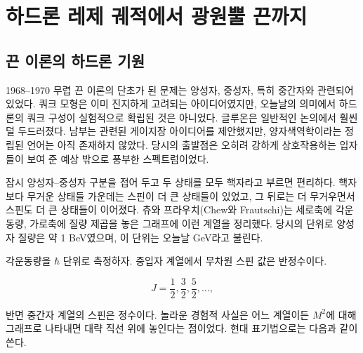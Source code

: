 \chapter{하드론 레제 궤적에서 광원뿔 끈까지}


\section{끈 이론의 하드론 기원}

1968--1970 무렵 끈 이론의 단초가 된 문제는 양성자, 중성자, 특히 중간자와 관련되어 있었다. 쿼크 모형은 이미 진지하게 고려되는 아이디어였지만, 오늘날의 의미에서 하드론의 쿼크 구성이 실험적으로 확립된 것은 아니었다. 글루온은 일반적인 논의에서 훨씬 덜 두드러졌다. 남부는 관련된 게이지장 아이디어를 제안했지만, 양자색역학이라는 정립된 언어는 아직 존재하지 않았다. 당시의 출발점은 오히려 강하게 상호작용하는 입자들이 보여 준 예상 밖으로 풍부한 스펙트럼이었다.

잠시 양성자--중성자 구분을 접어 두고 두 상태를 모두 핵자라고 부르면 편리하다. 핵자보다 무거운 상태들 가운데는 스핀이 더 큰 상태들이 있었고, 그 뒤로는 더 무거우면서 스핀도 더 큰 상태들이 이어졌다. 츄와 프라우치(Chew와 Frautschi)는 세로축에 각운동량, 가로축에 질량 제곱을 놓은 그래프에 이런 계열을 정리했다. 당시의 단위로 양성자 질량은 약 1 BeV였으며, 이 단위는 오늘날 GeV라고 불린다.

각운동량을 \(\hbar\) 단위로 측정하자. 중입자 계열에서 무차원 스핀 값은 반정수이다.

\begin{equation}
  J=\frac12,\frac32,\frac52,\ldots,
\end{equation}

반면 중간자 계열의 스핀은 정수이다. 놀라운 경험적 사실은 어느 계열이든 \(M^2\)에 대해 그래프로 나타내면 대략 직선 위에 놓인다는 점이었다. 현대 표기법으로는 다음과 같이 쓴다.

